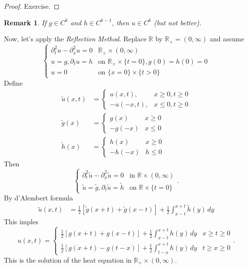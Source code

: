 \documentclass{report}
\theoremstyle{tommy}
\newtheorem{rem}[defn]{Remark}
\begin{document}
	\begin{proof}
		Exercise.
	\end{proof}

	\begin{rem}
		If \(g \in C^k\) and \(h \in C^{k-1}\), then \(u \in C^k\) (but not better).
	\end{rem}

	Now, let's apply the \emph{Reflection Method}. Replace \(\mathbb{R}\) by \(\mathbb{R}_+ = (0,\infty)\) and assume
	\[\begin{cases}
		\partial_t^2 u - \partial_x^2 u = 0 &\mathbb{R}_+ \times (0,\infty) \\
		u = g, \partial_t u = h &\text{on } \mathbb{R}_+ \times \{t = 0\}, g(0) = h(0) = 0 \\
		u = 0 &\text{on } \{x = 0\} \times \{t > 0\}
	\end{cases}\]
	Define
	\begin{align*}
		\tilde u(x,t) &= \begin{cases}
			u(x,t),&x \ge 0, t \ge 0 \\
			-u(-x,t),&x \le 0, t \ge 0
		\end{cases}\\
		\tilde g(x) &= \begin{cases}
			g(x) &x \ge 0 \\
			-g(-x) &x \le 0
		\end{cases} \\
		\tilde h(x) &= \begin{cases}
			h(x) &x \ge 0 \\
			-h(-x) &h \le 0
		\end{cases}
	\end{align*}
	Then 
	\[\begin{cases}
		\partial_t^2 \tilde u - \partial_x^2 \tilde u = 0 &\text{in } \mathbb{R} \times (0,\infty) \\
		\tilde u = \tilde g, \partial_t \tilde u = \tilde h & \text{on } \mathbb{R} \times \{t = 0\}
	\end{cases}.\]
	By d'Alembert formula 
	\begin{align*}
		\tilde u(x,t) &= \frac{1}{2} \left[\tilde g(x+t) + \tilde g(x-t)\right] + \frac{1}{2} \int_{x - t}^{x+t} \tilde h(y) \, dy
	\end{align*}
  This imples 
  \[u(x,t) = \begin{cases}
    \frac{1}{2} [g(x+t)+g(x-t)] + \frac{1}{2} \int_{x-t}^{x+t}h(y) \, dy &x \ge t \ge 0 \\
    \frac{1}{2} [g(x+t)-g(t-x)] + \frac{1}{2} \int_{t-x}^{x+t} h(y) \, dy &t \ge x \ge 0
  \end{cases}.\]
  This is the solution of the heat equation in \(\mathbb{R}_+ \times (0,\infty)\).
\end{document}
